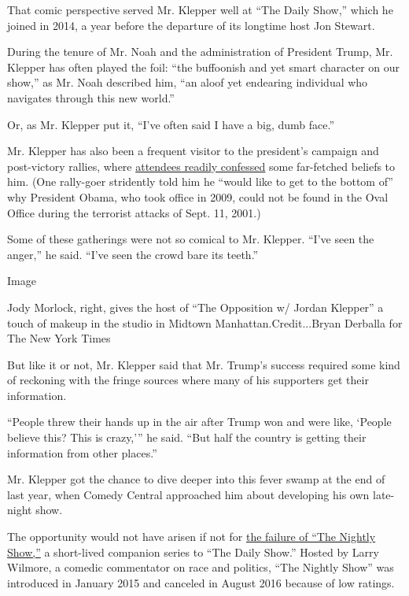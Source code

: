 That comic perspective served Mr. Klepper well at ``The Daily Show,''
which he joined in 2014, a year before the departure of its longtime
host Jon Stewart.

During the tenure of Mr. Noah and the administration of President Trump,
Mr. Klepper has often played the foil: ``the buffoonish and yet smart
character on our show,'' as Mr. Noah described him, ``an aloof yet
endearing individual who navigates through this new world.''

Or, as Mr. Klepper put it, ``I've often said I have a big, dumb face.''

Mr. Klepper has also been a frequent visitor to the president's campaign
and post-victory rallies, where
\href{https://www.youtube.com/watch?v=eFQhw3VVToQ}{attendees readily
confessed} some far-fetched beliefs to him. (One rally-goer stridently
told him he ``would like to get to the bottom of'' why President Obama,
who took office in 2009, could not be found in the Oval Office during
the terrorist attacks of Sept. 11, 2001.)

Some of these gatherings were not so comical to Mr. Klepper. ``I've seen
the anger,'' he said. ``I've seen the crowd bare its teeth.''

Image

Jody Morlock, right, gives the host of ``The Opposition w/ Jordan
Klepper'' a touch of makeup in the studio in Midtown
Manhattan.Credit...Bryan Derballa for The New York Times

But like it or not, Mr. Klepper said that Mr. Trump's success required
some kind of reckoning with the fringe sources where many of his
supporters get their information.

``People threw their hands up in the air after Trump won and were like,
`People believe this? This is crazy,''' he said. ``But half the country
is getting their information from other places.''

Mr. Klepper got the chance to dive deeper into this fever swamp at the
end of last year, when Comedy Central approached him about developing
his own late-night show.

The opportunity would not have arisen if not for
\href{https://www.nytimes3xbfgragh.onion/2016/08/16/business/media/comedy-central-cancels-larry-wilmores-late-night-show.html}{the
failure of ``The Nightly Show,''} a short-lived companion series to
``The Daily Show.'' Hosted by Larry Wilmore, a comedic commentator on
race and politics, ``The Nightly Show'' was introduced in January 2015
and canceled in August 2016 because of low ratings.


